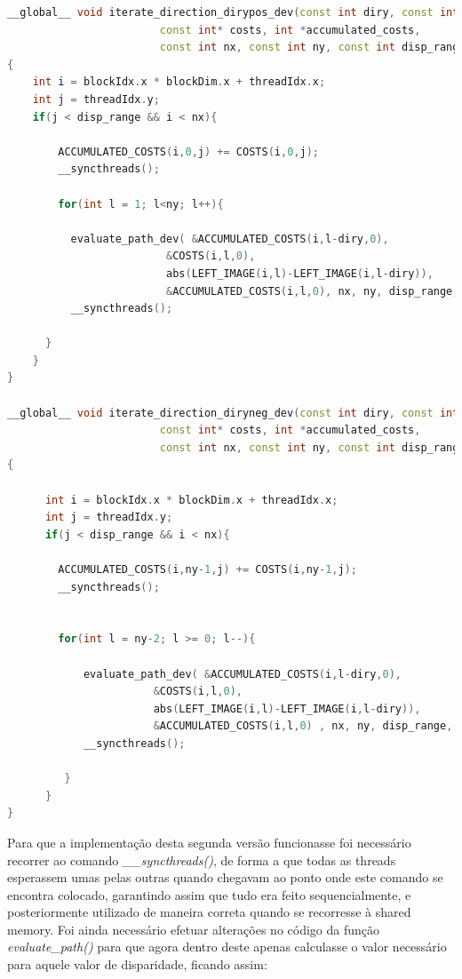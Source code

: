 \documentclass[pdftex,12pt,a4paper]{report}
\begin{document}
 \begin{lstlisting}[language=c++, basicstyle=\scriptsize]
__global__ void iterate_direction_dirypos_dev(const int diry, const int *left_image,
                        const int* costs, int *accumulated_costs,
                        const int nx, const int ny, const int disp_range )
{
    int i = blockIdx.x * blockDim.x + threadIdx.x;
    int j = threadIdx.y;
    if(j < disp_range && i < nx){

        ACCUMULATED_COSTS(i,0,j) += COSTS(i,0,j);
        __syncthreads();

        for(int l = 1; l<ny; l++){

          evaluate_path_dev( &ACCUMULATED_COSTS(i,l-diry,0),
                         &COSTS(i,l,0),
                         abs(LEFT_IMAGE(i,l)-LEFT_IMAGE(i,l-diry)),
                         &ACCUMULATED_COSTS(i,l,0), nx, ny, disp_range, j);
          __syncthreads();

      }
    }
}

__global__ void iterate_direction_diryneg_dev(const int diry, const int *left_image,
                        const int* costs, int *accumulated_costs,
                        const int nx, const int ny, const int disp_range )
{

      int i = blockIdx.x * blockDim.x + threadIdx.x;
      int j = threadIdx.y;
      if(j < disp_range && i < nx){

        ACCUMULATED_COSTS(i,ny-1,j) += COSTS(i,ny-1,j);
        __syncthreads();


        for(int l = ny-2; l >= 0; l--){

            evaluate_path_dev( &ACCUMULATED_COSTS(i,l-diry,0),
                       &COSTS(i,l,0),
                       abs(LEFT_IMAGE(i,l)-LEFT_IMAGE(i,l-diry)),
                       &ACCUMULATED_COSTS(i,l,0) , nx, ny, disp_range, j);
            __syncthreads();

         }
      }
}

\end{lstlisting} 

Para que a implementação desta segunda versão funcionasse foi necessário recorrer ao comando \textit{\_\_syncthreads()}, de forma a que todas as threads esperassem umas pelas outras quando chegavam ao ponto onde este comando se encontra colocado, garantindo assim que tudo era feito sequencialmente, e posteriormente utilizado de maneira correta quando se recorresse à shared memory. Foi ainda necessário efetuar alterações no código da função \textit{evaluate\_path()} para que agora dentro deste apenas calculasse o valor necessário para aquele valor de disparidade, ficando assim:
\end{document}
